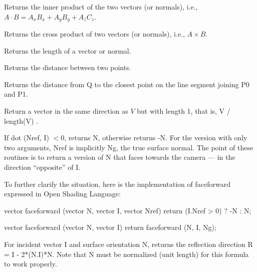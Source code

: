 \documentclass[11pt,letterpaper]{book}
\def\langname{Open Shading Language\xspace}
\begin{document}
Returns the inner product of the two vectors (or normals), i.e., 
$A \cdot B = A_x B_x + A_y B_y + A_z C_z$.
\apiend

Returns the cross product of two vectors (or normals), i.e., 
$A \times B$.
\apiend

Returns the length of a vector or normal.
\apiend

Returns the distance between two points.
\apiend

Returns the distance from {\cf Q} to the closest point on the line
segment joining {\cf P0} and {\cf P1}.
\apiend

Return a vector in the same direction as $V$ but with length 1,
that is, {\cf V / length(V)} .
\apiend

If {\cf dot (Nref, I)} $<0$, returns {\cf N}, otherwise returns {\cf -N}.
For the version with only two arguments, {\cf Nref} is implicitly {\cf
Ng}, the true surface normal.  The point of these routines is to
return a version of {\cf N} that faces towards the camera --- in the
direction ``opposite'' of {\cf I}.

To further clarify the situation, here is the implementation of
{\cf faceforward} expressed in \langname:

\begin{code}
vector faceforward (vector N, vector I, vector Nref)
{
    return (I.Nref > 0) ? -N : N;
}

vector faceforward (vector N, vector I)
{
    return faceforward (N, I, Ng);
}
\end{code}
\apiend

For incident vector {\cf I} and surface orientation {\cf N}, returns the
reflection direction {\cf R = I - 2*(N.I)*N}.  Note that {\cf N} must be
normalized (unit length) for this formula to work properly.
\apiend
\end{document}
